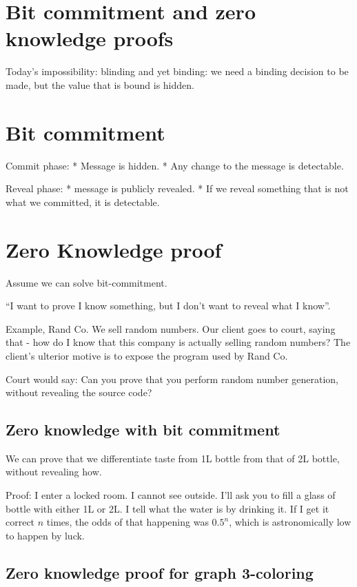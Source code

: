 \documentclass[11pt]{article}
\begin{document}
\section{Bit commitment and zero knowledge proofs}

Today's impossibility: blinding and yet binding: we need a binding decision to be made, but the
value that is bound is hidden.


\section{Bit commitment}

Commit phase: 
* Message is hidden.
* Any change to the message is detectable.

Reveal phase:
* message is publicly revealed.
* If we reveal something that is not what we committed, it is detectable.

\section{Zero Knowledge proof}
Assume we can solve bit-commitment.

``I want to prove I know something, but I don't want to reveal what I know''.

Example, Rand Co. We sell random numbers. Our client goes to court, saying that - how do I know that this
company is actually selling random numbers? The client's ulterior motive is to expose the program used by Rand Co.

Court would say: Can you prove that you perform random number generation, without revealing the source code?


\subsection{Zero knowledge with bit commitment}
We can prove that we differentiate taste from 1L bottle from that of 2L bottle, without revealing how.

Proof: I enter a locked room. I cannot see outside. I'll ask you to fill a glass of bottle with either 1L
or 2L. I tell what the water is by drinking it. If I get it correct $n$ times, the odds of that happening was $0.5^n$,
which is astronomically low to happen by luck.


\subsection{Zero knowledge proof for graph 3-coloring}
\end{document}
